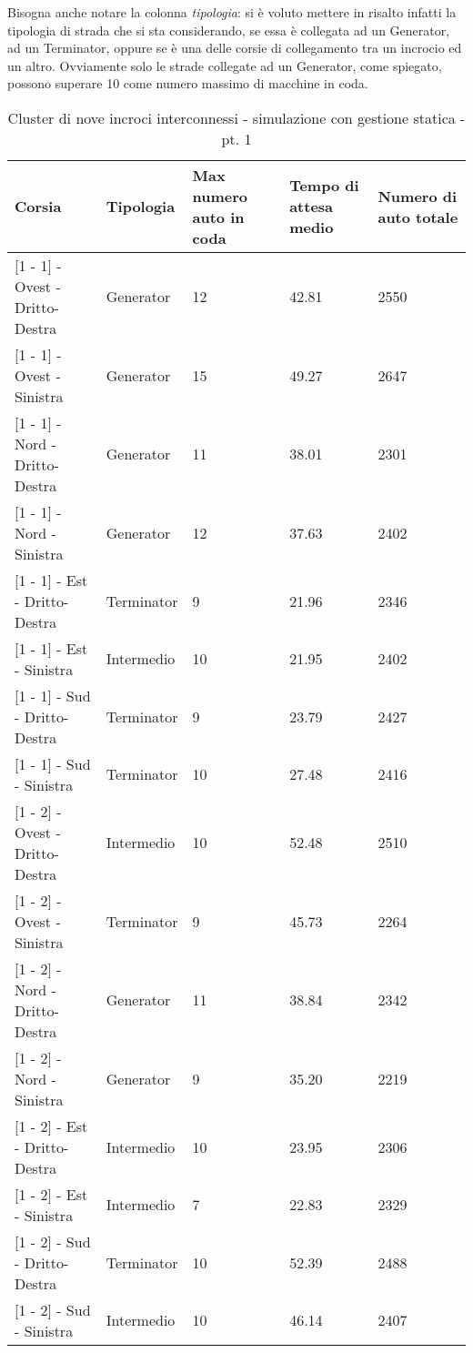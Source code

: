 Bisogna anche notare la colonna \textit{tipologia}: si è voluto mettere in risalto infatti la tipologia di strada che si sta considerando, se essa è collegata ad un Generator, ad un Terminator, oppure se è una delle corsie di collegamento tra un incrocio ed un altro. Ovviamente solo le strade collegate ad un Generator, come spiegato, possono superare 10 come numero massimo di macchine in coda.
\begin{table}[H]
\centering
\begin{tabular}{|C{2cm}|C{2cm}|C{3cm}|C{3cm}|C{3cm}|}
\hline
\textbf{Corsia} &
\textbf{Tipologia} &
\textbf{Max numero auto in coda} &
\textbf{Tempo di attesa medio} &
\textbf{Numero di auto totale} \\\hline
\scriptsize{[1 - 1] - Ovest - Dritto-Destra} &
Generator &
12 &
42.81 &
2550 \\\hline
\scriptsize{[1 - 1] - Ovest - Sinistra} &
Generator &
15 &
49.27 &
2647 \\\hline
\scriptsize{[1 - 1] - Nord - Dritto-Destra} &
Generator &
11 &
38.01 &
2301 \\\hline
\scriptsize{[1 - 1] - Nord - Sinistra} &
Generator &
12 &
37.63 &
2402 \\\hline
\scriptsize{[1 - 1] - Est - Dritto-Destra} &
Terminator &
9 &
21.96 &
2346 \\\hline
\scriptsize{[1 - 1] - Est - Sinistra} &
Intermedio &
10 &
21.95 &
2402 \\\hline
\scriptsize{[1 - 1] - Sud - Dritto-Destra} &
Terminator &
9 &
23.79 &
2427 \\\hline
\scriptsize{[1 - 1] - Sud - Sinistra} &
Terminator &
10 &
27.48 &
2416 \\\hline
\scriptsize{[1 - 2] - Ovest - Dritto-Destra} &
Intermedio &
10 &
52.48 &
2510 \\\hline
\scriptsize{[1 - 2] - Ovest - Sinistra} &
Terminator &
9 &
45.73 &
2264 \\\hline
\scriptsize{[1 - 2] - Nord - Dritto-Destra} &
Generator &
11 &
38.84 &
2342 \\\hline
\scriptsize{[1 - 2] - Nord - Sinistra} &
Generator &
9 &
35.20 &
2219 \\\hline
\scriptsize{[1 - 2] - Est - Dritto-Destra} &
Intermedio &
10 &
23.95 &
2306 \\\hline
\scriptsize{[1 - 2] - Est - Sinistra} &
Intermedio &
7 &
22.83 &
2329 \\\hline
\scriptsize{[1 - 2] - Sud - Dritto-Destra} &
Terminator &
10 &
52.39 &
2488 \\\hline
\scriptsize{[1 - 2] - Sud - Sinistra} &
Intermedio &
10 &
46.14 &
2407 \\\hline
\end{tabular}
\caption{Cluster di nove incroci interconnessi - simulazione con gestione statica - pt. 1}
\label{table:keytable}
\end{table}
